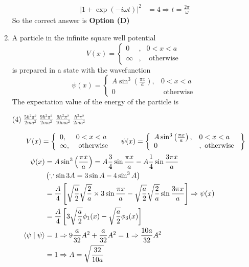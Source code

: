 \begin{enumerate}
\begin{answer}
\begin{align*}
|1+\exp (-i \omega t)|^{2}&=4 \Rightarrow t=\frac{2 \pi}{\omega}
\end{align*}
So the correct answer is \textbf{Option (D)}
\end{answer}	
\item A particle in the infinite square well potential
$$
V(x)=\left\{\begin{array}{lll}
0 & , & 0<x<a \\
\infty & , & \text { otherwise }
\end{array}\right.
$$
is prepared in a state with the wavefunction
$$
\psi(x)=\left\{\begin{array}{ll}
A \sin ^{3}\left(\frac{\pi x}{a}\right), & 0<x<a \\
0 & \text { otherwise }
\end{array}\right.
$$
The expectation value of the energy of the particle is
{}
\begin{tasks}(4)
\task[\textbf{A.}] $\frac{5 \hbar^{2} \pi^{2}}{2 m a^{2}}$
\task[\textbf{B.}]  $\frac{9 \hbar^{2} \pi^{2}}{2 m a^{2}}$
\task[\textbf{C.}] $\frac{9 \hbar^{2} \pi^{2}}{10 m a^{2}}$
\task[\textbf{D.}] $\frac{\hbar^{2} \pi^{2}}{2 m a^{2}}$
\end{tasks}
\begin{answer}
\begin{align*}
\intertext{	$V(x)=\left\{\begin{array}{ll}0, & 0<x<a \\ \infty, & \text { otherwise }\end{array} \quad \psi(x)=\left\{\begin{array}{ll}A \sin ^{3}\left(\frac{\pi x}{a}\right), & 0<x<a \\ 0 & , \text { otherwise }\end{array}\right\}\right.$}
\psi(x)&=A \sin ^{3}\left(\frac{\pi x}{a}\right)=A \frac{3}{4} \sin \frac{\pi x}{a}-A \frac{1}{4} \sin \frac{3 \pi x}{a} \\&\left(\because \sin 3 A=3 \sin A-4 \sin ^{3} A\right)\\
&=\frac{A}{4}\left[\sqrt{\frac{a}{2}} \sqrt{\frac{2}{a}} \times 3 \sin \frac{\pi x}{a}-\sqrt{\frac{a}{2}} \sqrt{\frac{2}{a}} \sin \frac{3 \pi x}{a}\right] \Rightarrow \psi(x)\\&=\frac{A}{4}\left[3 \sqrt{\frac{a}{2}} \phi_{1}(x)-\sqrt{\frac{a}{2}} \phi_{3}(x)\right]\\
\langle\psi \mid \psi\rangle&=1 \Rightarrow 9 \frac{a}{32} A^{2}+\frac{a}{32} A^{2}=1 \Rightarrow \frac{10 a}{32} A^{2}\\&=1 \Rightarrow A=\sqrt{\frac{32}{10 a}}\\

\end{align*}
\end{answer}
\end{enumerate}
